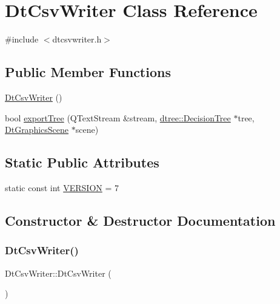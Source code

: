 \hypertarget{class_dt_csv_writer}{}\section{Dt\+Csv\+Writer Class Reference}
\label{class_dt_csv_writer}


{\ttfamily \#include $<$dtcsvwriter.\+h$>$}

\subsection*{Public Member Functions}
\begin{DoxyCompactItemize}
\item 
\mbox{\hyperlink{class_dt_csv_writer_ae2a64cd9757912d7f4aaad3cfc116a9c}{Dt\+Csv\+Writer}} ()
\item 
bool \mbox{\hyperlink{class_dt_csv_writer_aa66c5371953f95c69017505f72f03714}{export\+Tree}} (Q\+Text\+Stream \&stream, \mbox{\hyperlink{classdtree_1_1_decision_tree}{dtree\+::\+Decision\+Tree}} $\ast$tree, \mbox{\hyperlink{class_dt_graphics_scene}{Dt\+Graphics\+Scene}} $\ast$scene)
\end{DoxyCompactItemize}
\subsection*{Static Public Attributes}
\begin{DoxyCompactItemize}
\item 
static const int \mbox{\hyperlink{class_dt_csv_writer_ab4049ecb1ce899489de41d1b726b9059}{V\+E\+R\+S\+I\+ON}} = 7
\end{DoxyCompactItemize}


\subsection{Constructor \& Destructor Documentation}
\mbox{\label{class_dt_csv_writer_ae2a64cd9757912d7f4aaad3cfc116a9c}} 
\subsubsection{\texorpdfstring{DtCsvWriter()}{DtCsvWriter()}}
{\footnotesize\ttfamily Dt\+Csv\+Writer\+::\+Dt\+Csv\+Writer (\begin{DoxyParamCaption}{ }\end{DoxyParamCaption})}



